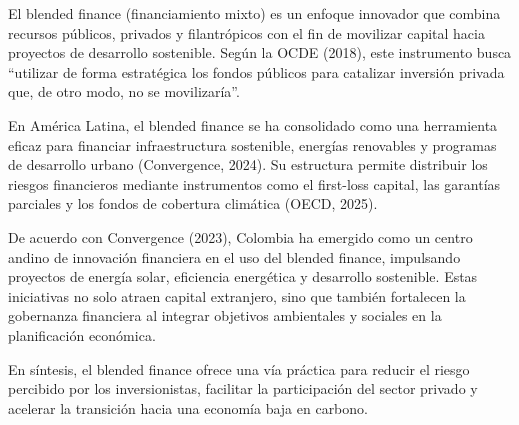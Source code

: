 El blended finance (financiamiento mixto) es un enfoque innovador que combina recursos públicos, privados y filantrópicos con el fin de movilizar capital hacia proyectos de desarrollo sostenible. Según la OCDE (2018), este instrumento busca ``utilizar de forma estratégica los fondos públicos para catalizar inversión privada que, de otro modo, no se movilizaría''.

En América Latina, el blended finance se ha consolidado como una herramienta eficaz para financiar infraestructura sostenible, energías renovables y programas de desarrollo urbano (Convergence, 2024). Su estructura permite distribuir los riesgos financieros mediante instrumentos como el first-loss capital, las garantías parciales y los fondos de cobertura climática (OECD, 2025).

De acuerdo con Convergence (2023), Colombia ha emergido como un centro andino de innovación financiera en el uso del blended finance, impulsando proyectos de energía solar, eficiencia energética y desarrollo sostenible. Estas iniciativas no solo atraen capital extranjero, sino que también fortalecen la gobernanza financiera al integrar objetivos ambientales y sociales en la planificación económica.

En síntesis, el blended finance ofrece una vía práctica para reducir el riesgo percibido por los inversionistas, facilitar la participación del sector privado y acelerar la transición hacia una economía baja en carbono.